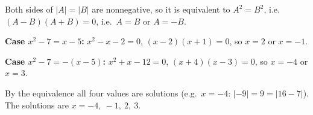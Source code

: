 Both sides of $|A|=|B|$ are nonnegative, so it is equivalent to $A^2=B^2$, i.e.\ $(A-B)(A+B)=0$, i.e.\ $A=B$ or $A=-B$.

\textbf{Case $x^2-7=x-5$:} $x^2-x-2=0$, $(x-2)(x+1)=0$, so $x=2$ or $x=-1$.

\textbf{Case $x^2-7=-(x-5)$:} $x^2+x-12=0$, $(x+4)(x-3)=0$, so $x=-4$ or $x=3$.

By the equivalence all four values are solutions (e.g.\ $x=-4$: $|-9|=9=|16-7|$). The solutions are $\boxed{x=-4,\ -1,\ 2,\ 3}$.
